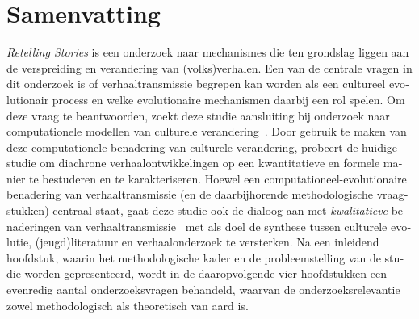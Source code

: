 
\chapter*{Samenvatting} 

\begin{otherlanguage}{dutch}
\noindent \emph{Retelling Stories} is een onderzoek naar mechanismes die ten grondslag liggen aan de verspreiding en verandering van (volks)verhalen. Een van de centrale vragen in dit onderzoek is of verhaaltransmissie begrepen kan worden als een cultureel evolutionair process en welke evolutionaire mechanismen daarbij een rol spelen. Om deze vraag te beantwoorden, zoekt deze studie aansluiting bij onderzoek naar computationele modellen van culturele verandering~\autocite[Zie bijvoorbeeld:][]{sforzafeldman:1981,boyd_richerson:1985,mesoudi:2011,mesoudi:2015}. Door gebruik te maken van deze computationele benadering van culturele verandering, probeert de huidige studie om diachrone verhaalontwikkelingen op een kwantitatieve en formele manier te bestuderen en te karakteriseren. Hoewel een computationeel-evolutionaire benadering van verhaaltransmissie (en de daarbijhorende methodologische vraagstukken) centraal staat, gaat deze studie ook de dialoog aan met \emph{kwalitatieve} benaderingen van verhaaltransmissie~\autocite[Zie bijvoorbeeld:][]{stephens_mccallum,boyd:2009,boyd:2010,zipes:2006,zipes:2012,geerts:2014} met als doel de synthese tussen culturele evolutie, (jeugd)literatuur en verhaalonderzoek te versterken. Na een inleidend hoofdstuk, waarin het methodologische kader en de probleemstelling van de studie worden gepresenteerd, wordt in de daaropvolgende vier hoofdstukken een evenredig aantal onderzoeksvragen behandeld, waarvan de onderzoeksrelevantie zowel methodologisch als theoretisch van aard is.  


\end{otherlanguage}
